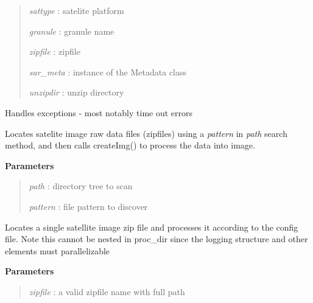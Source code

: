 \documentclass[letterpaper,10pt,openany,oneside]{sphinxmanual}
\begin{document}
\begin{fulllineitems}
\begin{fulllineitems}
\begin{quote}
\emph{sattype}  : satelite platform

\emph{granule}  : granule name

\emph{zipfile}  : zipfile

\emph{sar\_meta} : instance of the Metadata class

\emph{unzipdir} : unzip directory
\end{quote}

\end{fulllineitems}


\begin{fulllineitems}
\label{code:SigLib.SigLib.handler}
Handles exceptions - most notably time out errors

\end{fulllineitems}


\begin{fulllineitems}
\label{code:SigLib.SigLib.proc_Dir}
Locates satelite image raw data files (zipfiles) using a
\emph{pattern} in \emph{path} search method, and then calls createImg()
to process the data into image.

\textbf{Parameters}
\begin{quote}

\emph{path}    : directory tree to scan

\emph{pattern} : file pattern to discover
\end{quote}

\end{fulllineitems}


\begin{fulllineitems}
\label{code:SigLib.SigLib.proc_File}
Locates a single satellite image zip file and processes it according 
to the config file.  Note this cannot be nested in proc\_dir since the 
logging structure and other elements must parallelizable

\textbf{Parameters}
\begin{quote}

\emph{zipfile} : a valid zipfile name with full path
\end{quote}


\end{fulllineitems}
\end{fulllineitems}
\end{document}
